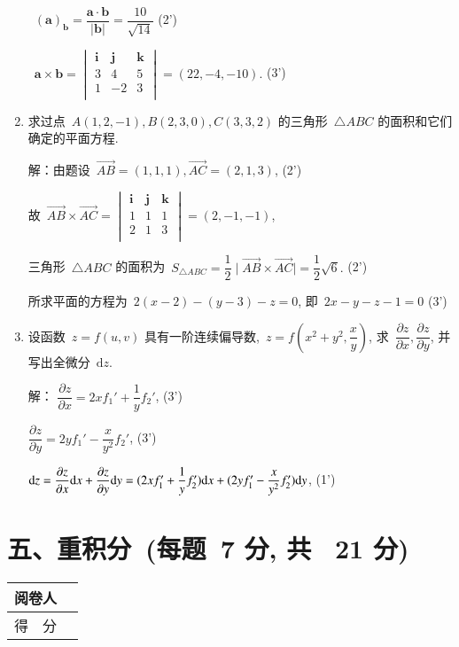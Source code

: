 \documentclass[twocolumn,landscape,UTF8]{ctexart}
\newcommand{\dif}{\mathrm{d}}
\newcommand{\bs}{\boldsymbol}%
\begin{document}
\begin{spacing}{1.3}
\begin{enumerate}
		~$(\bs{a})_{\bs{b}} = \dfrac{\bs{a}\cdot\bs{b}}{|\bs{b}|}=\dfrac{10}{\sqrt{14}}$ \dotfill{}(2')
		
		~$\bs{a}\times\bs{b} = \begin{vmatrix}
		\bs{i} & \bs{j} & \bs{k}\\
		3 & 4 & 5\\
		1 & -2 & 3\\
		\end{vmatrix}=(22,-4,-10).$ \dotfill{}(3')
\item  求过点~$A(1,2,-1), B(2,3,0),C(3,3,2)$ 的三角形~$\triangle ABC$ 的面积和它们确定的平面方程.

解：由题设~$\overrightarrow{AB}=(1,1,1),\overrightarrow{AC}=(2,1,3)$, \dotfill{}(2')

故~$\overrightarrow{AB}\times \overrightarrow{AC}=\begin{vmatrix}
\bs{i}&\bs{j} &\bs{k}\\
1&1&1\\
2&1&3\\
\end{vmatrix}=(2,-1,-1)$,

三角形~$\triangle ABC$ 的面积为~$S_{\triangle ABC}=\dfrac{1}{2}\mid\overrightarrow{AB}\times \overrightarrow{AC}\mid=\dfrac{1}{2}\sqrt{6}.$  \dotfill{}(2')

所求平面的方程为~$2(x-2)-(y-3)-z=0$, 即~$2x-y-z-1=0$
 \dotfill{}(3')			

\item 设函数~$z = f(u,v)$ 具有一阶连续偏导数,~$z = f(x^2+y^2,\dfrac{x}{y})$, 求~$\dfrac{\partial z}{\partial x}, \dfrac{\partial z}{\partial y}$, 并写出全微分~$\dif z$.
			
解： $\dfrac{\partial z}{\partial x} = 2xf_1' + \dfrac{1}{y}f_2'$, \dotfill{}(3')
			
$\dfrac{\partial z}{\partial y} = 2y f_1' - \dfrac{x}{y^2}f_2'$, \dotfill{}(3')
			
$\dif z =\dfrac{\partial z}{\partial x}\dif x + \dfrac{\partial z}{\partial y} \dif y\\	=(2xf_1' + \dfrac{1}{y}f_2')\dif x +(2y f_1' - \dfrac{x}{y^2}f_2')\dif y$, \dotfill{}(1')
\end{enumerate}
\vspace{2cm}

\newpage
\section*{\hspace{5cm}五、重积分~(每题~7 分, 共~ 21 分)}
\vspace{-1cm}
\begin{tabular}{|p{}|p{}|}
\hline
\centering 阅卷人& \\
\hline
\centering 得~~分 &  \\
\hline
\end{tabular}
		

\end{spacing}
\end{document}
